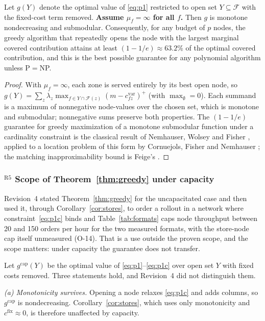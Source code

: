 \begin{theorem}\label{thm:greedy}
Let $g(Y)$ denote the optimal value of \eqref{eq:p1} restricted to open set $Y\subseteq\mathcal{F}$ with the fixed-cost term removed. \textbf{Assume $\mu_f=\infty$ for all $f$.} Then $g$ is monotone nondecreasing and submodular. Consequently, for any budget of $p$ nodes, the greedy algorithm that repeatedly opens the node with the largest marginal covered contribution attains at least $(1-1/e)\approx 63.2\%$ of the optimal covered contribution, and this is the best possible guarantee for any polynomial algorithm unless P${=}$NP.
\end{theorem}
\begin{proof}
With $\mu_f=\infty$, each zone is served entirely by its best open node, so $g(Y)=\sum_z\lambda_z\max_{f\in Y\cap\mathcal{F}(z)}(m-c^{\mathrm{var}}_{fz})^+$ (with $\max_\emptyset=0$). Each summand is a maximum of nonnegative node-values over the chosen set, which is monotone and submodular; nonnegative sums preserve both properties. The $(1-1/e)$ guarantee for greedy maximization of a monotone submodular function under a cardinality constraint is the classical result of Nemhauser, Wolsey and Fisher \cite{nemhauser1978}, applied to a location problem of this form by Cornuejols, Fisher and Nemhauser \cite{cornuejols1977}; the matching inapproximability bound is Feige's \cite{feige1998}.
\end{proof}

\subsubsection*{$^{\mathrm{R5}}$ Scope of Theorem~\ref{thm:greedy} under capacity}\label{sec:capacitated}

Revision~4 stated Theorem~\ref{thm:greedy} for the uncapacitated case and then used it, through Corollary~\ref{cor:stores}, to order a rollout in a network where constraint~\eqref{eq:p1c} binds and Table~\ref{tab:formats} caps node throughput between 20 and 150 orders per hour for the two measured formats, with the store-node cap itself unmeasured (O-14). That is a use outside the proven scope, and the scope matters: under capacity the guarantee does not transfer.

Let $g^{\mathrm{cap}}(Y)$ be the optimal value of \eqref{eq:p1}--\eqref{eq:p1c} over open set $Y$ with fixed costs removed. Three statements hold, and Revision~4 did not distinguish them.

\emph{(a) Monotonicity survives.} Opening a node relaxes \eqref{eq:p1c} and adds columns, so $g^{\mathrm{cap}}$ is nondecreasing. Corollary~\ref{cor:stores}, which uses only monotonicity and $c^{\mathrm{fix}}\approx0$, is therefore unaffected by capacity.

